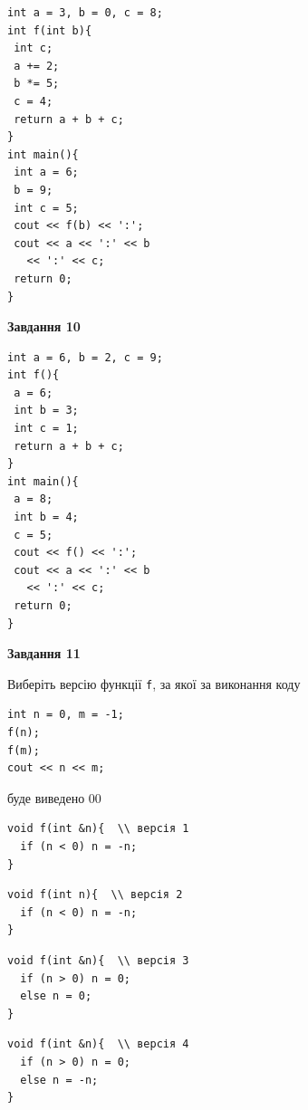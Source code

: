 \documentclass[12pt, ukrainian]{article}
\def\code#1{\Verb!#1!}
\begin{document}
{\begin {large}
\begin{minipage}[t]{7.0cm}
\begin{verbatim}
int a = 3, b = 0, c = 8;
int f(int b){
 int c;
 a += 2;
 b *= 5;
 c = 4;
 return a + b + c;
}
int main(){
 int a = 6;
 b = 9;
 int c = 5;
 cout << f(b) << ':';
 cout << a << ':' << b 
   << ':' << c;
 return 0;
}
\end{verbatim}



\begin{center}
\textbf{Завдання 10}
\end{center}
\vspace{-8mm}

\begin{verbatim}
int a = 6, b = 2, c = 9;
int f(){
 a = 6;
 int b = 3;
 int c = 1;
 return a + b + c;
}
int main(){
 a = 8;
 int b = 4;
 c = 5;
 cout << f() << ':';
 cout << a << ':' << b 
   << ':' << c;
 return 0;
}
\end{verbatim}

\end{minipage}
\vline \hspace{1mm}
\begin{minipage}[t]{11.0cm}

\begin{center}
\textbf{Завдання 11}
\end{center}
Виберіть версію функції \code{f}, за якої за виконання коду
\begin{verbatim}
int n = 0, m = -1;
f(n);
f(m);
cout << n << m;
\end{verbatim}

буде виведено 00

\begin{verbatim}
void f(int &n){  \\ версія 1
  if (n < 0) n = -n;
}
\end{verbatim}

\vspace{-8mm}\begin{verbatim}
void f(int n){  \\ версія 2
  if (n < 0) n = -n;
}
\end{verbatim}

\vspace{-8mm}\begin{verbatim}
void f(int &n){  \\ версія 3
  if (n > 0) n = 0;
  else n = 0;
}
\end{verbatim}

\vspace{-8mm}\begin{verbatim}
void f(int &n){  \\ версія 4
  if (n > 0) n = 0;
  else n = -n;
}
\end{verbatim}




\end{minipage}
\end{large}}
\end{document}
